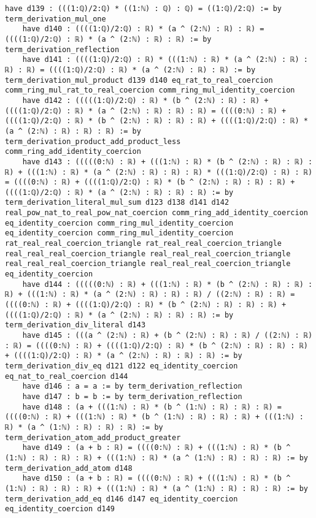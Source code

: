 \documentclass{article}
\begin{document}
\begin{tcolorbox}[colback=white!10, width=\linewidth]
\begin{lstlisting}[language=Lean4]
    have d139 : (((1:ℚ)/2:ℚ) * ((1:ℕ) : ℚ) : ℚ) = ((1:ℚ)/2:ℚ) := by term_derivation_mul_one
    have d140 : ((((1:ℚ)/2:ℚ) : ℝ) * (a ^ (2:ℕ) : ℝ) : ℝ) = ((((1:ℚ)/2:ℚ) : ℝ) * (a ^ (2:ℕ) : ℝ) : ℝ) := by term_derivation_reflection
    have d141 : ((((1:ℚ)/2:ℚ) : ℝ) * (((1:ℕ) : ℝ) * (a ^ (2:ℕ) : ℝ) : ℝ) : ℝ) = ((((1:ℚ)/2:ℚ) : ℝ) * (a ^ (2:ℕ) : ℝ) : ℝ) := by term_derivation_mul_product d139 d140 eq_rat_to_real_coercion comm_ring_mul_rat_to_real_coercion comm_ring_mul_identity_coercion
    have d142 : (((((1:ℚ)/2:ℚ) : ℝ) * (b ^ (2:ℕ) : ℝ) : ℝ) + ((((1:ℚ)/2:ℚ) : ℝ) * (a ^ (2:ℕ) : ℝ) : ℝ) : ℝ) = ((((0:ℕ) : ℝ) + ((((1:ℚ)/2:ℚ) : ℝ) * (b ^ (2:ℕ) : ℝ) : ℝ) : ℝ) + ((((1:ℚ)/2:ℚ) : ℝ) * (a ^ (2:ℕ) : ℝ) : ℝ) : ℝ) := by term_derivation_product_add_product_less comm_ring_add_identity_coercion
    have d143 : (((((0:ℕ) : ℝ) + (((1:ℕ) : ℝ) * (b ^ (2:ℕ) : ℝ) : ℝ) : ℝ) + (((1:ℕ) : ℝ) * (a ^ (2:ℕ) : ℝ) : ℝ) : ℝ) * (((1:ℚ)/2:ℚ) : ℝ) : ℝ) = ((((0:ℕ) : ℝ) + ((((1:ℚ)/2:ℚ) : ℝ) * (b ^ (2:ℕ) : ℝ) : ℝ) : ℝ) + ((((1:ℚ)/2:ℚ) : ℝ) * (a ^ (2:ℕ) : ℝ) : ℝ) : ℝ) := by term_derivation_literal_mul_sum d123 d138 d141 d142 real_pow_nat_to_real_pow_nat_coercion comm_ring_add_identity_coercion eq_identity_coercion comm_ring_mul_identity_coercion eq_identity_coercion comm_ring_mul_identity_coercion rat_real_real_coercion_triangle rat_real_real_coercion_triangle real_real_real_coercion_triangle real_real_real_coercion_triangle real_real_real_coercion_triangle real_real_real_coercion_triangle eq_identity_coercion
    have d144 : (((((0:ℕ) : ℝ) + (((1:ℕ) : ℝ) * (b ^ (2:ℕ) : ℝ) : ℝ) : ℝ) + (((1:ℕ) : ℝ) * (a ^ (2:ℕ) : ℝ) : ℝ) : ℝ) / ((2:ℕ) : ℝ) : ℝ) = ((((0:ℕ) : ℝ) + ((((1:ℚ)/2:ℚ) : ℝ) * (b ^ (2:ℕ) : ℝ) : ℝ) : ℝ) + ((((1:ℚ)/2:ℚ) : ℝ) * (a ^ (2:ℕ) : ℝ) : ℝ) : ℝ) := by term_derivation_div_literal d143
    have d145 : (((a ^ (2:ℕ) : ℝ) + (b ^ (2:ℕ) : ℝ) : ℝ) / ((2:ℕ) : ℝ) : ℝ) = ((((0:ℕ) : ℝ) + ((((1:ℚ)/2:ℚ) : ℝ) * (b ^ (2:ℕ) : ℝ) : ℝ) : ℝ) + ((((1:ℚ)/2:ℚ) : ℝ) * (a ^ (2:ℕ) : ℝ) : ℝ) : ℝ) := by term_derivation_div_eq d121 d122 eq_identity_coercion eq_nat_to_real_coercion d144
    have d146 : a = a := by term_derivation_reflection
    have d147 : b = b := by term_derivation_reflection
    have d148 : (a + (((1:ℕ) : ℝ) * (b ^ (1:ℕ) : ℝ) : ℝ) : ℝ) = ((((0:ℕ) : ℝ) + (((1:ℕ) : ℝ) * (b ^ (1:ℕ) : ℝ) : ℝ) : ℝ) + (((1:ℕ) : ℝ) * (a ^ (1:ℕ) : ℝ) : ℝ) : ℝ) := by term_derivation_atom_add_product_greater
    have d149 : (a + b : ℝ) = ((((0:ℕ) : ℝ) + (((1:ℕ) : ℝ) * (b ^ (1:ℕ) : ℝ) : ℝ) : ℝ) + (((1:ℕ) : ℝ) * (a ^ (1:ℕ) : ℝ) : ℝ) : ℝ) := by term_derivation_add_atom d148
    have d150 : (a + b : ℝ) = ((((0:ℕ) : ℝ) + (((1:ℕ) : ℝ) * (b ^ (1:ℕ) : ℝ) : ℝ) : ℝ) + (((1:ℕ) : ℝ) * (a ^ (1:ℕ) : ℝ) : ℝ) : ℝ) := by term_derivation_add_eq d146 d147 eq_identity_coercion eq_identity_coercion d149

\end{lstlisting}
\end{tcolorbox}
\end{document}
